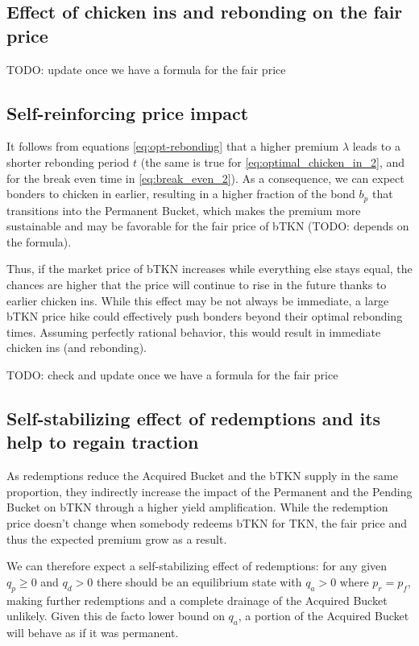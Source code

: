 \documentclass{article}
\begin{document}
\subsection{Effect of chicken ins and rebonding on the fair price}
TODO: update once we have a formula for the fair price

\subsection{Self-reinforcing price impact}
It follows from equations \ref{eq:opt-rebonding} that a higher premium $\lambda$ leads to a shorter rebonding period $t$ (the same is true for \ref{eq:optimal_chicken_in_2}, and for the break even time in \ref{eq:break_even_2}). As a consequence, we can expect bonders to chicken in earlier, resulting in a higher fraction of the bond $b_p$ that transitions into the Permanent Bucket, which makes the premium more sustainable and may be favorable for the fair price of bTKN (TODO: depends on the formula).

Thus, if the market price of bTKN increases while everything else stays equal, the chances are higher that the price will continue to rise in the future thanks to earlier chicken ins. While this effect may be not always be immediate, a large bTKN price hike could effectively push bonders beyond their optimal rebonding times.
Assuming perfectly rational behavior, this would result in immediate chicken ins (and rebonding).

TODO: check and update once we have a formula for the fair price

\subsection{Self-stabilizing effect of redemptions and its help to regain traction}
  \label{sec:self-stabilizing}
As redemptions reduce the Acquired Bucket and the bTKN supply in the same proportion, they indirectly increase the impact of the Permanent and the Pending Bucket on bTKN through a higher yield amplification. While the redemption price doesn't change when somebody redeems bTKN for TKN, the fair price and thus the expected premium grow as a result. 

We can therefore expect a self-stabilizing effect of redemptions: for any given $q_p \geq 0$ and $q_d > 0$ there should be an equilibrium state with $q_a > 0$ where $p_r = p_f$, making further redemptions and a complete drainage of the Acquired Bucket unlikely. Given this de facto lower bound on $q_a$, a portion of the Acquired Bucket will behave as if it was permanent.
\end{document}

